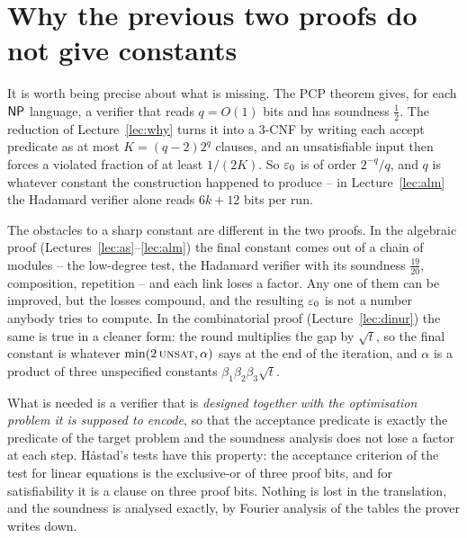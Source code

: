 \section{Why the previous two proofs do not give constants}
\label{sec:why-constants}

It is worth being precise about what is missing.  The PCP theorem gives, for each $\mathsf{NP}$ language, a verifier that reads $q=O(1)$ bits and has soundness $\tfrac12$.  The reduction of Lecture~\ref{lec:why} turns it into a $3$-CNF by writing each accept predicate as at most $K=(q-2)2^q$ clauses, and an unsatisfiable input then forces a violated fraction of at least $1/(2K)$.
So $\varepsilon_0$ is of order $2^{-q}/q$, and $q$ is whatever constant the construction happened to produce -- in Lecture~\ref{lec:alm} the Hadamard verifier alone reads $6k+12$ bits per run.

The obstacles to a sharp constant are different in the two proofs.
In the algebraic proof (Lectures~\ref{lec:as}--\ref{lec:alm}) the final constant comes out of a chain of modules -- the low-degree test, the Hadamard verifier with its soundness $\tfrac{19}{20}$, composition, repetition -- and each link loses a factor.  Any one of them can be improved, but the losses compound, and the resulting $\varepsilon_0$ is not a number anybody tries to compute.
In the combinatorial proof (Lecture~\ref{lec:dinur}) the same is true in a cleaner form: the round multiplies the gap by $\sqrt t$, so the final constant is whatever $\min(2\,\textsc{unsat},\alpha)$ says at the end of the iteration, and $\alpha$ is a product of three unspecified constants $\beta_1\beta_2\beta_3\sqrt t$.

What is needed is a verifier that is \emph{designed together with the optimisation problem it is supposed to encode}, so that the acceptance predicate is exactly the predicate of the target problem and the soundness analysis does not lose a factor at each step.
H\aa stad's tests have this property: the acceptance criterion of the test for linear equations is the exclusive-or of three proof bits, and for satisfiability it is a clause on three proof bits.  Nothing is lost in the translation, and the soundness is analysed exactly, by Fourier analysis of the tables the prover writes down.

